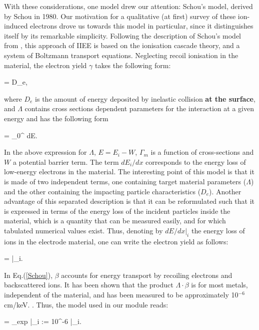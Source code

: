 \noindent With these considerations, one model drew our attention: Schou's model, derived by Schou in 1980. Our motivation for a qualitative (at first) survey of these ion-induced electrons drove us towards this model in particular, since it distinguishes itself by its remarkable simplicity. Following the description of Schou's model from \cite{HasselII}, this approach of IIEE is based on the ionisation cascade theory, and a system of Boltzmann transport equations.  Neglecting recoil ionisation in the material, the electron yield $\gamma$ takes the following form: 

\beq
\gamma = \Lambda \cdot D_e,
\eeq

\noindent where $D_e$ is the amount of energy deposited by inelastic collision \textbf{at the surface}, and $\Lambda$ contains cross sections dependent parameters for the interaction at a given energy and has the following form 

\beq
\Lambda = \int_0^{\infty} dE.
\eeq

\noindent In the above expression for $\Lambda$, $E=E_i-W$, $\Gamma_m$ is a function of cross-sections and $W$ a potential barrier term. The term $dE_i/dx$ corresponds to the energy loss of low-energy electrons in the material. The interesting point of this model is that it is made of two independent terms, one containing target material parameters ($\Lambda$) and the other containing the impacting particle characteristics ($D_e$). Another advantage of this separated description is that it can be reformulated such that it is expressed in terms of the energy loss of the incident particles inside the material, which is a quantity that can be measured easily, and for which tabulated numerical values exist. Thus, denoting by $dE/dx\Big|_i$ the energy loss of ions in the electrode material, one can write the electron yield as follows: 

\beq
\gamma = \Lambda \cdot \beta \cdot  {}\Bigg|_i.\label{Schou}
\eeq

\noindent In Eq.(\ref{Schou}), $\beta$ accounts for energy transport by recoiling electrons and backscattered ions. It has been shown that the product $\Lambda\cdot\beta$ is for most metals, independent of the material, and has been measured to be approximately 10$^{-6}$ cm/keV. \cite{HasselII}. Thus, the model used in our module reads:

\beq
\gamma = \Lambda_{exp} \cdot  {}\Bigg|_i := 10^{-6} \cdot  {}\Bigg|_i.\label{Schou_def}
\eeq

